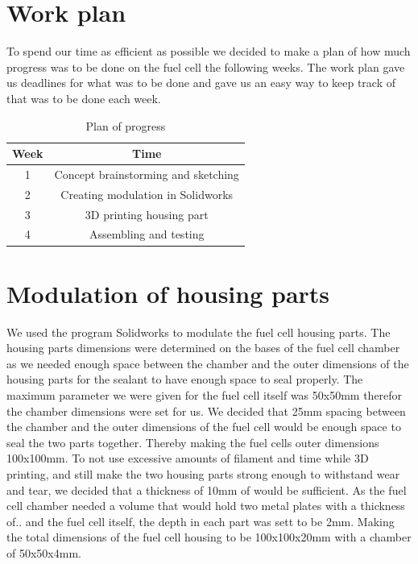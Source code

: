 \section{Work plan}

To spend our time as efficient as possible we decided to make a plan of how much progress was to be done on the fuel cell the following weeks. The work plan gave us deadlines for what was to be done and gave us an easy way to keep track of that was to be done each week.

\begin{center}
    \begin{table}[h]
        \centering
        \begin{tabular}{|c|c|}
        \hline
        Week & Time \\
        \hline
        1 & Concept brainstorming and sketching  \\ 
        \hline
        2 & Creating modulation in Solidworks \\
        \hline
        3 & 3D printing housing part \\
        \hline
        4 & Assembling and testing \\ 
        \hline
     \end{tabular}
     \caption{Plan of progress}
     \label{tab:Workplan}
    \end{table}
\end{center}



\section{Modulation of housing parts}

We used the program Solidworks to modulate the fuel cell housing parts. The housing parts dimensions were determined on the bases of the fuel cell chamber as we needed enough space between the chamber and the outer dimensions of the housing parts for the sealant to have enough space to seal properly. The maximum parameter we were given for the fuel cell itself was 50x50mm therefor the chamber dimensions were set for us. We decided that 25mm spacing between the chamber and the outer dimensions of the fuel cell would be enough space to seal the two parts together. Thereby making the fuel cells outer dimensions 100x100mm. To not use excessive amounts of filament and time while 3D printing, and still make the two housing parts strong enough to withstand wear and tear, we decided that a thickness of 10mm of would be sufficient. As the fuel cell chamber needed a volume that would hold two metal plates with a thickness
 of.. and the fuel cell itself, the depth in each part was sett to be 2mm. Making the total dimensions of the fuel cell housing to be 100x100x20mm with a chamber of 50x50x4mm.


